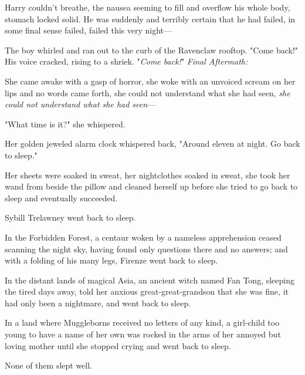 Harry couldn't breathe, the nausea seeming to fill and overflow his whole body, 
stomach locked solid. He was suddenly and terribly certain that he had failed, 
in some final sense failed, failed this very night---

The boy whirled and ran out to the curb of the Ravenclaw rooftop. "Come back!" 
His voice cracked, rising to a shriek. "\emph{Come back!}"
\sbreak
\emph{Final Aftermath:}

She came awake with a gasp of horror, she woke with an unvoiced scream on her 
lips and no words came forth, she could not understand what she had seen, 
\emph{she could not understand what she had seen}---

"What time is it?" she whispered.

Her golden jeweled alarm clock whispered back, "Around eleven at night. Go back 
to sleep."

Her sheets were soaked in sweat, her nightclothes soaked in sweat, she took her 
wand from beside the pillow and cleaned herself up before she tried to go back 
to sleep and eventually succeeded.

Sybill Trelawney went back to sleep.

In the Forbidden Forest, a centaur woken by a nameless apprehension ceased 
scanning the night sky, having found only questions there and no answers; and 
with a folding of his many legs, Firenze went back to sleep.

In the distant lands of magical Asia, an ancient witch named Fan Tong, sleeping 
the tired days away, told her anxious great-great-grandson that she was fine, 
it had only been a nightmare, and went back to sleep.

In a land where Muggleborns received no letters of any kind, a girl-child too 
young to have a name of her own was rocked in the arms of her annoyed but 
loving mother until she stopped crying and went back to sleep.

None of them slept well.